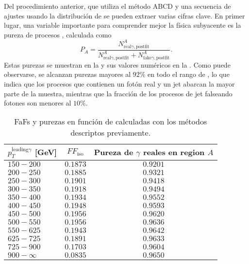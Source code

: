 Del procedimiento anterior, que utiliza el método ABCD y una secuencia de ajustes usando la distribución de \etiso se pueden extraer varias cifras clave. En primer lugar, una variable importante para comprender mejor la física subyacente es la pureza de procesos \gammajet, calculada como
\[
    P_A = \frac{
        N^{A}_{\text{real}\gamma, \text{postfit}}
    }{
        N^{A}_{\text{real}\gamma, \text{postfit}} + N^{A}_{\text{fake}\gamma, \text{postfit}}
    }.
\]
Estas purezas se muestran en la \Fig{\ref{fig:bkg:estimation:results:results:purities}} y sus valores numéricos en la \Tab{\ref{tab:bkg:estimation:results:ffiso_purity_values}}. Como puede observarse, se alcanzan purezas mayores al \(92\%\) en todo el rango de \ptgam, lo que indica que los procesos que contienen un fotón real y un jet abarcan la mayor parte de la muestra, mientras que la fracción de los procesos de jet falseando fotones son menores al \(10\%\).

\begin{table}[ht!]
    \caption{\acp{FaF} y purezas en función de \ptgam calculadas con los métodos descriptos previamente.}
    \begin{tabular}{lcc}
        \toprule
        \(p_{T}^{\text{leading} \gamma}\) [GeV] & \(FF_{\text{iso}}\) &  Pureza de \(\gamma\) reales en region \(A\) \\
        \midrule
        $150-200$    & $0.1873$ & $0.9201$ \\
        $200-250$    & $0.1885$ & $0.9321$ \\
        $250-300$    & $0.1901$ & $0.9418$ \\
        $300-350$    & $0.1918$ & $0.9494$ \\
        $350-400$    & $0.1934$ & $0.9552$ \\
        $400-450$    & $0.1948$ & $0.9593$ \\
        $450-500$    & $0.1956$ & $0.9620$ \\
        $500-550$    & $0.1956$ & $0.9636$ \\
        $550-625$    & $0.1943$ & $0.9642$ \\
        $625-725$    & $0.1891$ & $0.9633$ \\
        $725-900$    & $0.1703$ & $0.9604$ \\
        $900-\infty$ & $0.0835$ & $0.9650$ \\
        \bottomrule
    \end{tabular}
    \label{tab:bkg:estimation:results:ffiso_purity_values}
    \centering
\end{table}





